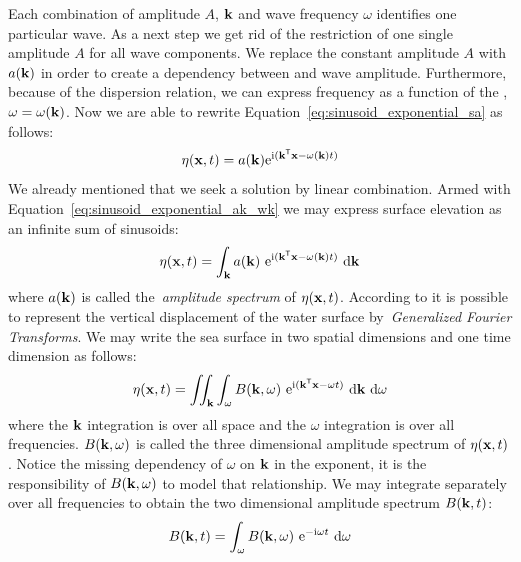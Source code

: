 Each combination of amplitude $A$, \wavevector $\mathbf{k}$ and wave frequency
$\omega$ identifies one particular wave. As a next step we get rid of the
restriction of one single amplitude $A$ for all wave components. We replace the
constant amplitude $A$ with $a(\mathbf{k})$ in order to create a dependency
between \wavevector and wave amplitude. Furthermore, because of the dispersion
relation, we can express frequency as a function of the \wavevector, $\omega =
\omega(\mathbf{k})$. Now we are able to rewrite
Equation~\ref{eq:sinusoid_exponential_sa} as follows:
\begin{equation}
\label{eq:sinusoid_exponential_ak_wk}
\eta(\mathbf{x}, t) =
a(\mathbf{k})\mathrm{e}^{\mathrm{i}(\mathbf{k}^{\mathsf{T}}\mathbf{x}-
\omega(\mathbf{k})t)}
\end{equation}
%
We already mentioned that we seek a solution by linear combination. Armed with
Equation~\ref{eq:sinusoid_exponential_ak_wk} we may express surface
elevation as an infinite sum of sinusoids:
\begin{equation}
\label{eq:surface_elevation_akwt}
 \eta(\mathbf{x}, t) = \int_{\mathbf{k}}
a(\mathbf{k})~\mathrm{e}^{\mathrm{i}(\mathbf{k}^{\mathsf{T}}\mathbf{x}-
\omega(\mathbf{k})t)}~\mathrm{d}\mathbf{k}
\end{equation}
where $a(\mathbf{k})$ is called the~\emph{amplitude spectrum} of
$\eta(\mathbf{x}, t)$. According to \citet{book:kinsman2002wind} it is possible to
represent the vertical displacement of the water surface by~\emph{Generalized
Fourier Transforms}. We may write the sea surface in two spatial dimensions and
one time dimension as follows:
%
\begin{equation}
\label{eq:surface_elevation_bkwt}
 \eta(\mathbf{x}, t) = \iint_{\mathbf{k}}\int_{\omega} B(\mathbf{k},
\omega)~\mathrm{e}^{\mathrm{i}(\mathbf{k}^{\mathsf{T}}\mathbf{x}-
\omega t)}~
\mathrm{d}\mathbf{k}~\mathrm{d}\omega
\end{equation}
where the $\mathbf{k}$ integration is over all \wavenumber space and the $\omega$
integration is over all frequencies. $B(\mathbf{k},\omega)$ is called the
three dimensional amplitude spectrum of $\eta(\mathbf{x}, t)$. Notice the missing
dependency of $\omega$ on $\mathbf{k}$ in the exponent, it is the responsibility
of $B(\mathbf{k},\omega)$ to model that relationship.
We may integrate separately over all frequencies to obtain the two dimensional
amplitude spectrum $B(\mathbf{k}, t)$:
%
\begin{equation}
 B(\mathbf{k}, t) = \int_{\omega} B(\mathbf{k},
\omega)~\mathrm{e}^{-\mathrm{i}\omega t}~\mathrm{d}\omega
\end{equation}
